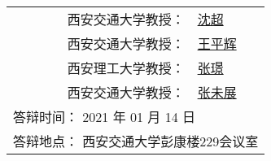 \begin{titlepage}
\begin{center}
{\begin{center}
\begin{tabular}{ll}
					\multicolumn{1}{r}{\hspace{2em}西安交通大学教授：} & \underline{\hspace{1.5em}沈超\hspace{7.5em}} \\
					\multicolumn{1}{r}{西安交通大学教授：} & \underline{\hspace{1em}王平辉\hspace{7em}} \\
					\multicolumn{1}{r}{西安理工大学教授：} & \underline{\hspace{1.5em}张璟\hspace{7.5em}} \\ 
					\multicolumn{1}{r}{西安交通大学教授：} & \underline{\hspace{1em}张未展\hspace{7em}} \\
					\multicolumn{2}{l}{答辩时间： 2021 年 01 月 14 日}\\
					\multicolumn{2}{l}{答辩地点： 西安交通大学彭康楼229会议室}\\
				\end{tabular} \renewcommand{\arraystretch}{1}
			\end{center} 
		}
	\end{center}
	\clearpage{\pagestyle{empty}\cleardoublepage}
\end{titlepage}